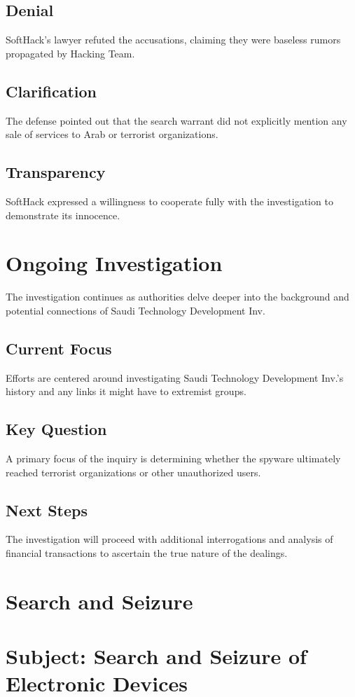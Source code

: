 \subsection{Denial}
SoftHack’s lawyer refuted the accusations, claiming they were baseless rumors propagated by Hacking Team.
\subsection{Clarification}
The defense pointed out that the search warrant did not explicitly mention any sale of services to Arab or terrorist organizations.
\subsection{Transparency}
SoftHack expressed a willingness to cooperate fully with the investigation to demonstrate its innocence.

\section{Ongoing Investigation}
The investigation continues as authorities delve deeper into the background and potential connections of Saudi Technology Development Inv.
\subsection{Current Focus}
Efforts are centered around investigating Saudi Technology Development Inv.’s history and any links it might have to extremist groups.
\subsection{Key Question}
A primary focus of the inquiry is determining whether the spyware ultimately reached terrorist organizations or other unauthorized users.
\subsection{Next Steps}
The investigation will proceed with additional interrogations and analysis of financial transactions to ascertain the true nature of the dealings.

\section{Search and Seizure}

\section{Subject: Search and Seizure of Electronic Devices}
